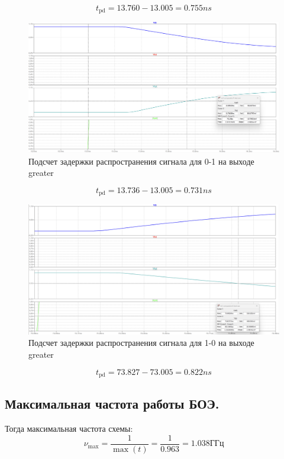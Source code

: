 \documentclass[12pt,onecolumn]{article}
\begin{document}
$$t_{\text{pd}} = 13.760 - 13.005 = 0.755 ns$$
\begin{figure}[H]
    \centering
    \includegraphics[width=\textwidth]{image/full-comparator-test-gt-01.png}
    \caption{Подсчет задержки распространения сигнала для 0-1 на выходе greater}
\end{figure}
$$t_{\text{pd}} = 13.736 - 13.005 = 0.731 ns$$
\begin{figure}[H]
    \centering
    \includegraphics[width=\textwidth]{image/full-comparator-test-gt-10.png}
    \caption{Подсчет задержки распространения сигнала для 1-0 на выходе greater}
\end{figure}
$$t_{\text{pd}} = 73.827 - 73.005 = 0.822 ns$$
\subsection{Максимальная частота работы БОЭ.}

Тогда максимальная частота схемы:
$$ \nu_{\max} = \frac{1}{\max(t)}= \frac{1}{0.963} = 1.038\text{ГГц}$$
\end{document}
